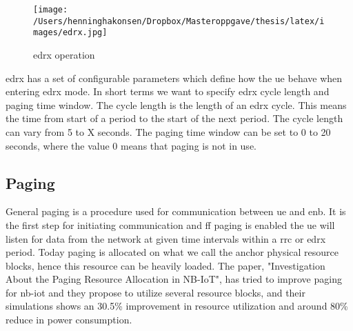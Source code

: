 \documentclass[USenglish]{ifimaster}  %
\begin{document}
\begin{figure}[ht]
  \centering\texttt{[image: /Users/henninghakonsen/Dropbox/Masteroppgave/thesis/latex/images/edrx.jpg]}
  \caption[\acrshort{edrx} operation]{\acrshort{edrx} operation \cite{online:edrxpsm}}
  \label{figure:edrx}
\end{figure}

\acrshort{edrx} has a set of configurable parameters which define how the \acrshort{ue} behave when entering \acrshort{edrx} mode. In short terms we want to specify \acrshort{edrx} cycle length and paging time window. The cycle length is the length of an \acrshort{edrx} cycle. This means the time from start of a period to the start of the next period. The cycle length can vary from 5 to X seconds. The paging time window can be set to 0 to 20 seconds, where the value 0 means that paging is not in use.

\subsection{Paging} \label{ssection:paging}
General paging is a procedure used for communication between \acrshort{ue} and \acrshort{enb}. It is the first step for initiating communication and ff paging is enabled the \acrshort{ue} will listen for data from the network at given time intervals within a \acrshort{rrc} or \acrshort{edrx} period. Today paging is allocated on what we call the anchor physical resource blocks, hence this resource can be heavily loaded. The paper, "Investigation About the Paging Resource Allocation
in NB-IoT"\cite{IEEEXplo82:online}, has tried to improve paging for \acrshort{nb-iot} and they propose to utilize several resource blocks, and their simulations shows an 30.5\% improvement in resource utilization and around 80\% reduce in power consumption.
\end{document}
